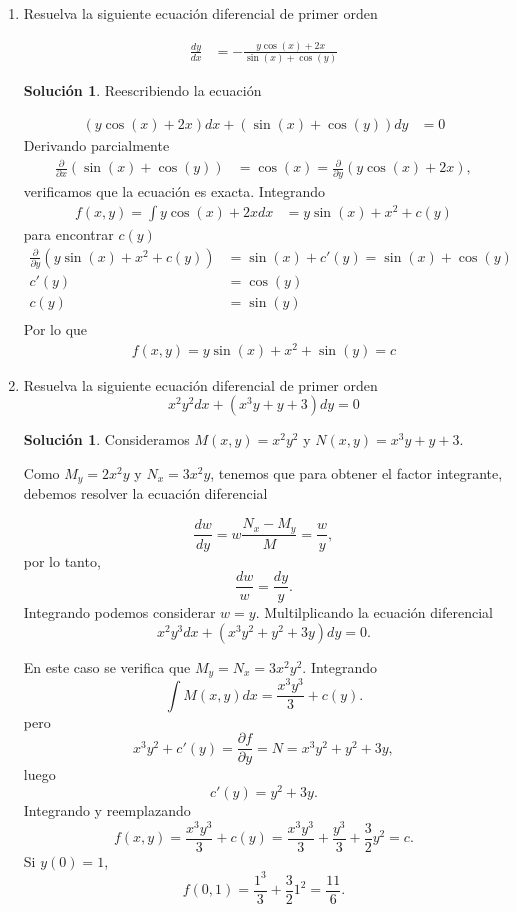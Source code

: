 \documentclass{article}
\theoremstyle{plain}
\theoremstyle{definition}
\newtheorem{sol}[thm]{Solución}
\begin{document}
\begin{enumerate}
\item Resuelva la siguiente ecuación diferencial de primer orden

\begin{align*}
  \frac{dy}{dx} &= -\frac{y\cos(x)+2x}{\sin(x)+\cos(y)}
\end{align*}


\begin{sol}Reescribiendo la ecuación
\end{sol}

\begin{align*}
  (y\cos(x)+2x) dx+(\sin(x)+\cos(y) )dy &= 0
\end{align*}
Derivando parcialmente
\begin{align*}
  \frac{\partial }{\partial x}(\sin(x)+\cos(y)) &= \cos(x) =\frac{\partial }{\partial y}(y\cos(x)+2x),
\end{align*}
verificamos que la ecuaci\'on es exacta. Integrando
\begin{align*}
  f(x,y)=\int y\cos(x)+2x dx&= y\sin(x)+x^2+c(y)
\end{align*}
para encontrar $c(y)$
\begin{align*}
  \frac{\partial }{\partial y} ( y\sin(x)+x^2+c(y))&=\sin(x)+c'(y)= \sin(x)+\cos(y)\\
  c'(y)&=\cos(y)\\
    c(y)&=\sin(y)\\
\end{align*}
Por lo que
\begin{align*}
  f(x,y)= y\sin(x)+x^2+\sin(y)=c
\end{align*}
\item Resuelva la siguiente ecuación diferencial de primer orden
\[x^2y^2 dx+(x^3y+y+3)dy=0\]
\begin{sol}Consideramos $M(x,y)=x^2y^2$ y $N(x,y)=x^3y+y+3$.
\end{sol}

Como $M_y=2x^2y$ y $N_x=3x^2y$, tenemos que para obtener el factor integrante, debemos resolver la ecuación diferencial

    \[\frac{dw}{dy}=w\frac{N_x-M_y}{M}=\frac{w}{y},\]
por lo tanto,
\[\frac{dw}{w}=\frac{dy}{y}.\]
Integrando podemos considerar $w=y$.
Multilplicando la ecuación diferencial
\[x^2y^3 dx + (x^3y^2+y^2+3y)dy=0.\]

En este caso se verifica que $M_y=N_x=3x^2y^2$. Integrando
\[\int M(x,y) dx=\frac{x^3y^3}{3}+c(y).\]
pero \[x^3y^2+c'(y)=\frac{\partial f}{\partial y}=N=x^3y^2+y^2+3y,\]
luego
\[c'(y)=y^2+3y.\]
Integrando y reemplazando
\[f(x,y)=\frac{x^3y^3}{3}+c(y)=\frac{x^3y^3}{3}+\frac{y^3}{3}+\frac{3}{2}y^2=c.\]
Si $y(0)=1$,
\[f(0,1)=\frac{1^3}{3}+\frac{3}{2}1^2=\frac{11}{6}.\]




\end{enumerate}
\end{document}
